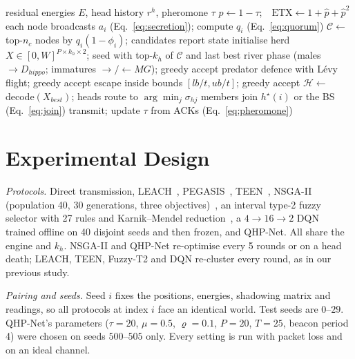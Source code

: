 \begin{algorithm}[t]
\caption{QHP-Net epoch (every 5 rounds or on head death)}
\label{alg:qhp}
\footnotesize
\begin{algorithmic}[1]
\Require residual energies $E$, head history $r^h$, pheromone $\tau$
\State $\hat p\gets 1-\tau$;\ \ $\text{ETX}\gets 1+\hat p+\hat p^2$ 
 each node broadcasts $a_i$ (Eq.~\ref{eq:secretion}); compute $q_i$ (Eq.~\ref{eq:quorum}) \EndIf
\State $\mathcal C\gets$ top-$n_c$ nodes by $q_i(1-\phi_i)$; candidates report state 
\State initialise herd $X\in[0,W]^{P\times k_h\times2}$; seed with top-$k_h$ of $\mathcal C$ and last best
 
  \State river phase (males $\to D_{hippo}$; immatures $\to/\leftarrow MG$); greedy accept
  \State predator defence with L\'evy flight; greedy accept
  \State escape inside bounds $[lb/t,ub/t]$; greedy accept
\EndFor
\State $\mathcal H\gets$ decode$(X_{best})$; heads route to $\arg\min_j\sigma_{hj}$ 
\State members join $h^\star(i)$ or the BS (Eq.~\ref{eq:join})
 transmit; update $\tau$ from ACKs (Eq.~\ref{eq:pheromone}) \EndFor
\end{algorithmic}
\end{algorithm}

\section{Experimental Design}
\emph{Protocols.} Direct transmission, LEACH~\cite{heinzelman2000leach}, PEGASIS~\cite{lindsey2002pegasis}, TEEN~\cite{manjeshwar2001teen}, NSGA-II (population 40, 30 generations, three objectives)~\cite{deb2002nsga2}, an interval type-2 fuzzy selector with 27 rules and Karnik--Mendel reduction~\cite{karnik1999type2}, a $4{\to}16{\to}2$ DQN~\cite{mnih2015dqn} trained offline on 40 disjoint seeds and then frozen, and QHP-Net. All share the engine and $k_h$. NSGA-II and QHP-Net re-optimise every 5 rounds or on a head death; LEACH, TEEN, Fuzzy-T2 and DQN re-cluster every round, as in our previous study.

\emph{Pairing and seeds.} Seed $i$ fixes the positions, energies, shadowing matrix and readings, so all protocols at index $i$ face an identical world. Test seeds are $0$--$29$. QHP-Net's parameters ($\tau{=}20$, $\mu{=}0.5$, $\varrho{=}0.1$, $P{=}20$, $T{=}25$, beacon period 4) were chosen on seeds $500$--$505$ only. Every setting is run with packet loss and on an ideal channel.

